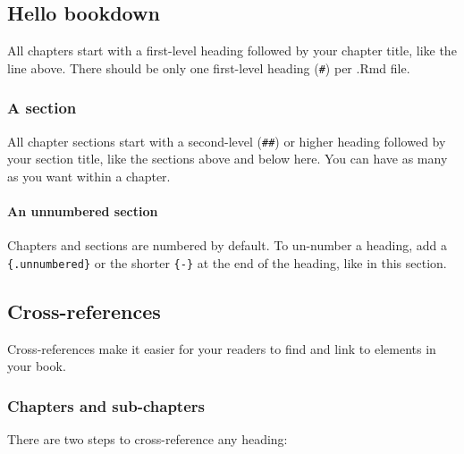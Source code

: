 \documentclass[
]{bxjsbook}
\theoremstyle{definition}
\theoremstyle{definition}
\theoremstyle{definition}
\theoremstyle{definition}
\theoremstyle{remark}
\begin{document}
\hypertarget{hello-bookdown}{%
\subsection{Hello bookdown}\label{hello-bookdown}}

All chapters start with a first-level heading followed by your chapter title, like the line above. There should be only one first-level heading (\texttt{\#}) per .Rmd file.

\hypertarget{a-section}{%
\subsubsection{A section}\label{a-section}}

All chapter sections start with a second-level (\texttt{\#\#}) or higher heading followed by your section title, like the sections above and below here. You can have as many as you want within a chapter.

\hypertarget{an-unnumbered-section}{%
\paragraph*{An unnumbered section}\label{an-unnumbered-section}}

Chapters and sections are numbered by default. To un-number a heading, add a \texttt{\{.unnumbered\}} or the shorter \texttt{\{-\}} at the end of the heading, like in this section.

\hypertarget{cross}{%
\subsection{Cross-references}\label{cross}}

Cross-references make it easier for your readers to find and link to elements in your book.

\hypertarget{chapters-and-sub-chapters}{%
\subsubsection{Chapters and sub-chapters}\label{chapters-and-sub-chapters}}

There are two steps to cross-reference any heading:
\end{document}
